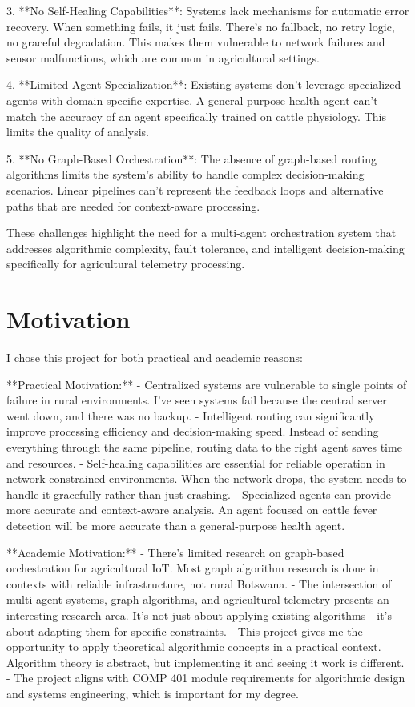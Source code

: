 3. **No Self-Healing Capabilities**: Systems lack mechanisms for automatic error recovery. When something fails, it just fails. There's no fallback, no retry logic, no graceful degradation. This makes them vulnerable to network failures and sensor malfunctions, which are common in agricultural settings.

4. **Limited Agent Specialization**: Existing systems don't leverage specialized agents with domain-specific expertise. A general-purpose health agent can't match the accuracy of an agent specifically trained on cattle physiology. This limits the quality of analysis.

5. **No Graph-Based Orchestration**: The absence of graph-based routing algorithms limits the system's ability to handle complex decision-making scenarios. Linear pipelines can't represent the feedback loops and alternative paths that are needed for context-aware processing.

These challenges highlight the need for a multi-agent orchestration system that addresses algorithmic complexity, fault tolerance, and intelligent decision-making specifically for agricultural telemetry processing.

\section{Motivation}

I chose this project for both practical and academic reasons:

**Practical Motivation:**
- Centralized systems are vulnerable to single points of failure in rural environments. I've seen systems fail because the central server went down, and there was no backup.
- Intelligent routing can significantly improve processing efficiency and decision-making speed. Instead of sending everything through the same pipeline, routing data to the right agent saves time and resources.
- Self-healing capabilities are essential for reliable operation in network-constrained environments. When the network drops, the system needs to handle it gracefully rather than just crashing.
- Specialized agents can provide more accurate and context-aware analysis. An agent focused on cattle fever detection will be more accurate than a general-purpose health agent.

**Academic Motivation:**
- There's limited research on graph-based orchestration for agricultural IoT. Most graph algorithm research is done in contexts with reliable infrastructure, not rural Botswana.
- The intersection of multi-agent systems, graph algorithms, and agricultural telemetry presents an interesting research area. It's not just about applying existing algorithms - it's about adapting them for specific constraints.
- This project gives me the opportunity to apply theoretical algorithmic concepts in a practical context. Algorithm theory is abstract, but implementing it and seeing it work is different.
- The project aligns with COMP 401 module requirements for algorithmic design and systems engineering, which is important for my degree.

